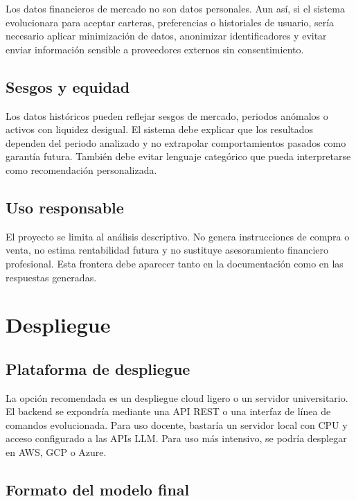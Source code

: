 \documentclass[11pt,a4paper]{article}
\let\oldsection\section
\renewcommand{\section}{\clearpage\oldsection}
\begin{document}
Los datos financieros de mercado no son datos personales. Aun as\'i, si el sistema evolucionara para aceptar carteras, preferencias o historiales de usuario, ser\'ia necesario aplicar minimizaci\'on de datos, anonimizar identificadores y evitar enviar informaci\'on sensible a proveedores externos sin consentimiento.

\subsection{Sesgos y equidad}

Los datos hist\'oricos pueden reflejar sesgos de mercado, periodos an\'omalos o activos con liquidez desigual. El sistema debe explicar que los resultados dependen del periodo analizado y no extrapolar comportamientos pasados como garant\'ia futura. Tambi\'en debe evitar lenguaje categ\'orico que pueda interpretarse como recomendaci\'on personalizada.

\subsection{Uso responsable}

El proyecto se limita al an\'alisis descriptivo. No genera instrucciones de compra o venta, no estima rentabilidad futura y no sustituye asesoramiento financiero profesional. Esta frontera debe aparecer tanto en la documentaci\'on como en las respuestas generadas.

\section{Despliegue}

\subsection{Plataforma de despliegue}

La opci\'on recomendada es un despliegue cloud ligero o un servidor universitario. El backend se expondr\'ia mediante una API REST o una interfaz de l\'inea de comandos evolucionada. Para uso docente, bastar\'ia un servidor local con CPU y acceso configurado a las APIs LLM. Para uso m\'as intensivo, se podr\'ia desplegar en AWS, GCP o Azure.

\subsection{Formato del modelo final}
\end{document}

